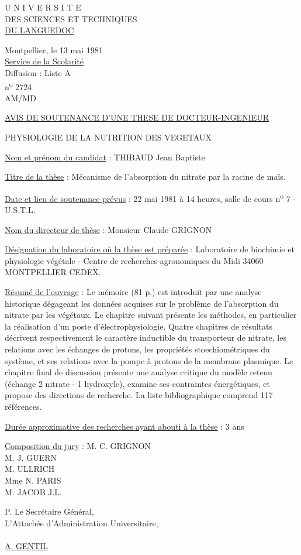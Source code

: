U N I V E R S I T E\\
DES SCIENCES ET TECHNIQUES\\
\uline{DU LANGUEDOC}

Montpellier, le 13 mai 1981\\
\uline{Service de la Scolarité}\\
Diffusion : Liste A\\
n\textsuperscript{o} 2724\\
AM/MD

\uline{AVIS DE SOUTENANCE D'UNE THESE DE DOCTEUR-INGENIEUR}

PHYSIOLOGIE DE LA NUTRITION DES VEGETAUX

\uline{Nom et prénom du candidat} : THIBAUD Jean Baptiste

\uline{Titre de la thèse} : Mécanisme de l'absorption du nitrate par la racine de maïs.

\uline{Date et lieu de soutenance prévus} : 22 mai 1981 à 14 heures, salle de cours n\textsuperscript{o} 7 - U.S.T.L.

\uline{Nom du directeur de thèse} : Monsieur Claude GRIGNON

\uline{Désignation du laboratoire où la thèse est préparée} : Laboratoire de biochimie et physiologie végétale - Centre de recherches agronomiques du Midi 34060 MONTPELLIER CEDEX.

\uline{Résumé de l'ouvrage} : Le mémoire (81 p.) est introduit par une analyse historique dégageant les données acquises sur le problème de l'absorption du nitrate par les végétaux. Le chapitre suivant présente les méthodes, en particulier la réalisation d'un poste d'électrophysiologie. Quatre chapitres de résultats décrivent respectivement le caractère inductible du transporteur de nitrate, les relations avec les échanges de protons, les propriétés stoechiométriques du système, et ses relations avec la pompe à protons de la membrane plasmique. Le chapitre final de discussion présente une analyse critique du modèle retenu (échange 2 nitrate - 1 hydroxyle), examine ses contraintes énergétiques, et propose des directions de recherche. La liste bibliographique comprend 117 références.

\uline{Durée approximative des recherches ayant abouti à la thèse} : 3 ans

\uline{Composition du jury} : M. C. GRIGNON\\
M. J. GUERN\\
M.  ULLRICH\\
Mme N. PARIS\\
M. JACOB J.L.

P. Le Secrétaire Général,\\
L'Attachée d'Administration Universitaire,\\
\\
\uline{A. GENTIL}
